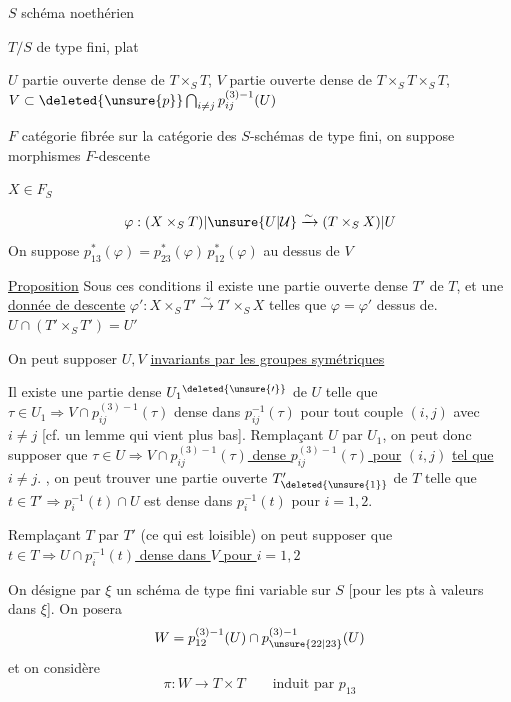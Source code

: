 $S$ schéma noethérien

$T/S$ de type fini,  plat

$U$ partie ouverte dense de $T\times_S T$, $V$ partie ouverte dense de $T\times_S T\times_S T$, $V\subset\deleted{\unsure{p}}\bigcap_{i\ne j}p_{ij}^{(3)-1}(U)$

$F$ catégorie fibrée sur la catégorie des $S$-schémas de type fini, on suppose     morphismes   $F$-descente 

$X\in F_S$

\[
\varphi:(X\times_S T)|\unsure{U|\mathcal{U}}\xrightarrow{\sim}(T\times_S X)|U
\]
On suppose $p_{13}^{*}(\varphi)={p}_{23}^{*}(\varphi)\,p_{12}^{*}(\varphi)$ au dessus de $V$

\uline{Proposition} Sous ces conditions il existe une partie ouverte dense $T'$  de $T$, et une \uline{donnée de descente} $\varphi':X\times_S T'\xrightarrow{\sim}T'\times_S X$ telles que $\varphi=\varphi'$  dessus de. $U\cap(T'\times_S T')=U'$

On peut supposer $U,V$ \uline{invariants par les groupes symétriques}

Il existe une partie  dense $U_{1}{}^{\deleted{\unsure{\prime}}}$ de $U$ telle que $\tau\in U_1\Rightarrow V\cap p_{ij}^{(3)-1}(\tau)$ dense dans $p_{ij}^{-1}(\tau)$ pour tout couple $(i,j)$ avec $i\ne j$ [cf. un lemme qui vient plus bas]. Remplaçant $U$ par $U_1$, on peut donc supposer que \uline{$\tau\in U\Rightarrow V\cap p_{ij}^{(3)-1}(\tau)$ dense  $p_{ij}^{(3)-1}(\tau)$ pour} $(i,j)$ \uline{tel que} $i\ne j$. , on peut trouver une partie ouverte $T'_{\deleted{\unsure{1}}}$ de $T$ telle que $t\in T'\Rightarrow p_i^{-1}(t)\cap U$ est dense dans $p_i^{-1}(t)$ pour $i=1,2$.

Remplaçant $T$ par $T'$ (ce qui est loisible) on peut supposer que \uline{$t\in T\Rightarrow U\cap p_i^{-1}(t)$ dense dans $V$ pour $i=1,2$}


On désigne par $\xi$ un schéma de type fini variable sur $S$ [pour  les pts à valeurs dans $\xi$]. On posera
\[
W=p_{12}^{(3)-1}(U)\cap p_{\unsure{22|23}}^{(3)-1}(U)
\]
et on considère
\[
\pi:W\longrightarrow T\times T\qquad\text{induit par }p_{13}
\]
